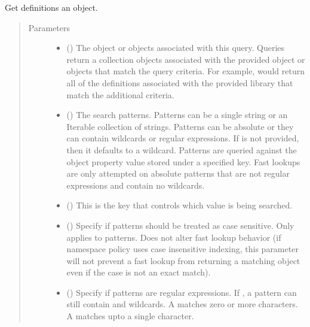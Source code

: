 \documentclass[letterpaper,10pt,english,openany,oneside]{sphinxmanual}
\begin{document}
\begin{fulllineitems}
\label{\detokenize{reference/classes/generated/spydrnet.get_definitions:spydrnet.get_definitions}}
Get definitions  an object.
\begin{quote}\begin{description}
\item[{Parameters}] \leavevmode\begin{itemize}
\item {} 
 () \textendash{} The object or objects associated with this query. Queries return a collection objects associated with the
provided object or objects that match the query criteria. For example,  would
return all of the definitions associated with the provided library that match the additional criteria.

\item {} 
 () \textendash{} The search patterns. Patterns can be a single string or an Iterable collection of strings. Patterns can be
absolute or they can contain wildcards or regular expressions. If  is not provided, then it defaults
to a wildcard. Patterns are queried against the object property value stored under a specified key. Fast lookups
are only attempted on absolute patterns that are not regular expressions and contain no wildcards.

\item {} 
 () \textendash{} This is the key that controls which value is being searched.

\item {} 
 () \textendash{} Specify if patterns should be treated as case sensitive. Only applies to patterns. Does not alter fast lookup
behavior (if namespace policy uses case insensitive indexing, this parameter will not prevent a fast lookup
from returning a matching object even if the case is not an exact match).

\item {} 
 () \textendash{} Specify if patterns are regular expressions. If , a pattern can still contain \sphinxtitleref{*} and  wildcards. A
\sphinxtitleref{*} matches zero or more characters. A  matches upto a single character.


\end{itemize}
\end{description}
\end{quote}
\end{fulllineitems}
\end{document}
